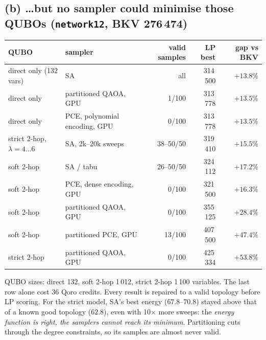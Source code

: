 \documentclass[11pt]{article}
\begin{document}
\subsection*{(b) \dots but no sampler could minimise those QUBOs (\texttt{network12}, BKV 276\,474)}
\begin{center}\small
\begin{tabular}{@{}llrrr@{}}
\toprule
QUBO & sampler & valid samples & LP best & gap vs BKV\\
\midrule
direct only (132 vars) & SA & all & 314\,500 & $+13.8\%$\\
direct only & partitioned QAOA, GPU & 1/100 & 313\,778 & $+13.5\%$\\
direct only & PCE, polynomial encoding, GPU & 0/100 & 313\,778 & $+13.5\%$\\
strict 2-hop, $\lambda=4\ldots6$ & SA, 2k--20k sweeps & 38--50/50 & 319\,410 & $+15.5\%$\\
soft 2-hop & SA / tabu & 26--50/50 & 324\,112 & $+17.2\%$\\
soft 2-hop & PCE, dense encoding, GPU & 0/100 & 321\,500 & $+16.3\%$\\
soft 2-hop & partitioned QAOA, GPU & 0/100 & 355\,125 & $+28.4\%$\\
soft 2-hop & partitioned PCE, GPU & 13/100 & 407\,500 & $+47.4\%$\\
strict 2-hop & partitioned QAOA, GPU & 0/100 & 425\,334 & $+53.8\%$\\
\bottomrule
\end{tabular}
\end{center}
QUBO sizes: direct 132, soft 2-hop 1\,012, strict 2-hop 1\,100 variables. The last row alone cost 36 Qoro credits. Every result is repaired to a valid topology before LP scoring. For the strict model, SA's
best energy ($67.8$--$70.8$) stayed above that of a known good topology ($62.8$), even with
10$\times$ more sweeps: the \emph{energy function is right, the samplers cannot reach its
minimum}. Partitioning cuts through the degree constraints, so its samples are almost never
valid.

\end{document}

